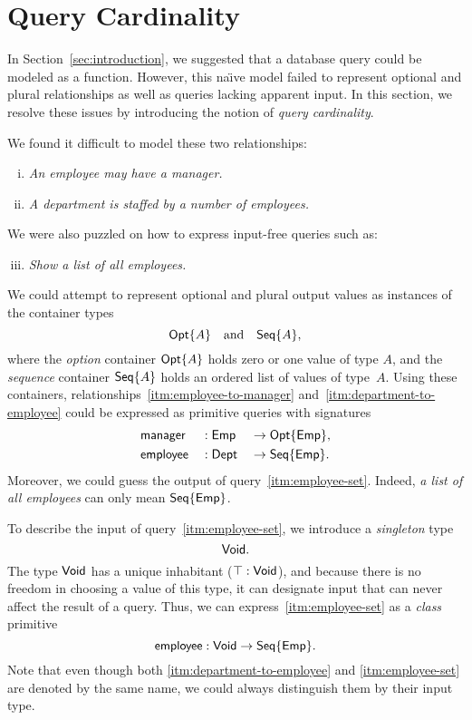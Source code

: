 
\section{Query Cardinality}
\label{sec:cardinality}

In Section~\ref{sec:introduction}, we suggested that a database query could be
modeled as a function.  However, this na\"{\i}ve model failed to represent
optional and plural relationships as well as queries lacking apparent input.
In this section, we resolve these issues by introducing the notion of
\emph{query cardinality}.

We found it difficult to model these two relationships:
\begin{enumerate}[(i)]
\item \label{itm:employee-to-manager}
\emph{An employee may have a manager.}
\item \label{itm:department-to-employee}
\emph{A department is staffed by a number of employees.}
\end{enumerate}
We were also puzzled on how to express input-free queries such as:
\begin{enumerate}[(i)]
\setcounter{enumi}{2}
\item \label{itm:employee-set}
\emph{Show a list of all employees.}
\end{enumerate}

We could attempt to represent optional and plural output values as instances of
the container types
\begin{equation*}
    \mathsf{Opt}{\left\{A\right\}} \quad \text{and} \quad \mathsf{Seq}{\left\{A\right\}},
\end{equation*}
where the \emph{option} container $\mathsf{Opt}{\left\{A\right\}}$ holds zero or one value of type
$A$, and the \emph{sequence} container $\mathsf{Seq}{\left\{A\right\}}$ holds an ordered list of
values of type~$A$.  Using these containers,
relationships~\ref{itm:employee-to-manager}
and~\ref{itm:department-to-employee} could be expressed as primitive queries
with signatures
\begin{alignat*}{3}
    & \mathsf{manager} && : \mathsf{Emp} && \to \mathsf{Opt}{\left\{\mathsf{Emp}\right\}}, \\
    & \mathsf{employee} && : \mathsf{Dept} && \to \mathsf{Seq}{\left\{\mathsf{Emp}\right\}}.
\end{alignat*}
Moreover, we could guess the output of query~\ref{itm:employee-set}.  Indeed,
\emph{a list of all employees} can only mean $\mathsf{Seq}{\left\{\mathsf{Emp}\right\}}$.

To describe the input of query~\ref{itm:employee-set}, we introduce a
\emph{singleton} type
\begin{equation*}
    \mathsf{Void}.
\end{equation*}
The type $\mathsf{Void}$ has a unique inhabitant ($\top:\mathsf{Void}$), and because there is
no freedom in choosing a value of this type, it can designate input that can
never affect the result of a query.  Thus, we can
express~\ref{itm:employee-set} as a \emph{class} primitive
\begin{equation*}
    \mathsf{employee} : \mathsf{Void} \to \mathsf{Seq}{\left\{\mathsf{Emp}\right\}}.
\end{equation*}
Note that even though both \ref{itm:department-to-employee} and
\ref{itm:employee-set} are denoted by the same name, we could always
distinguish them by their input type.

